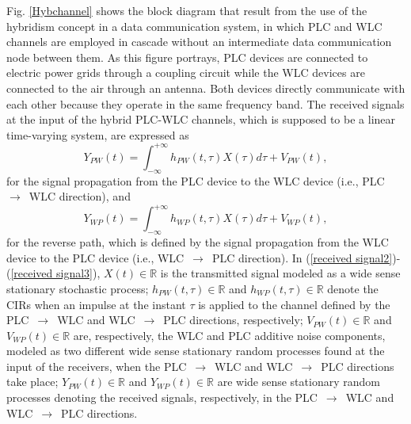 \documentclass[journal]{IEEEtran}
\begin{document}
Fig. \ref{Hybchannel} shows the block diagram that result from the use of the hybridism concept in a data communication system, in which \ac{PLC} and \ac{WLC} channels are employed in cascade without an intermediate data communication node between them. As this figure portrays, \ac{PLC} devices are connected to electric power grids through a coupling circuit while the \ac{WLC} devices are connected to the air through an antenna. Both devices directly communicate with each other because they operate in the same frequency band. The received signals at the input of the hybrid \ac{PLC}-\ac{WLC} channels, which is supposed to be a linear time-varying system, are expressed as
\begin{equation} \label{received signal2}
Y_{PW}(t) = \int_{-\infty}^{+\infty} h_{PW}(t,\tau) X(\tau) d\tau + V_{PW}(t),
\end{equation}
for the signal propagation from the \ac{PLC} device to the \ac{WLC} device (i.e., \ac{PLC}~$\rightarrow$~\ac{WLC} direction), and
\begin{equation} \label{received signal3}
Y_{WP}(t) = \int_{-\infty}^{+\infty} h_{WP}(t,\tau) X(\tau) d\tau + V_{WP}(t),
\end{equation}
for the reverse path, which is defined by the signal propagation from the \ac{WLC} device to the \ac{PLC} device (i.e., \ac{WLC}~$\rightarrow$~\ac{PLC} direction). In (\ref{received signal2})-(\ref{received signal3}),  $X(t)\in \mathbb{R}$ is the transmitted signal modeled as a wide sense stationary stochastic process; $h_{PW}(t,\tau)\in \mathbb{R}$ and $h_{WP}(t,\tau)\in \mathbb{R}$ denote the \acp{CIR} when an impulse at the instant $\tau$ is applied to the channel defined by the \ac{PLC}~$\rightarrow$~\ac{WLC} and \ac{WLC}~$\rightarrow$~\ac{PLC} directions, respectively; $V_{PW}(t)\in \mathbb{R}$ and $V_{WP}(t)\in \mathbb{R}$ are, respectively, the \ac{WLC} and \ac{PLC} additive noise components, modeled as two different wide sense stationary random processes found at the input of the receivers, when the \ac{PLC}~$\rightarrow$~\ac{WLC} and \ac{WLC}~$\rightarrow$~\ac{PLC} directions take place; $Y_{PW}(t)\in \mathbb{R}$ and ${Y}_{WP}(t)\in \mathbb{R}$ are wide sense stationary random processes denoting the received signals, respectively, in the \ac{PLC}~$\rightarrow$~\ac{WLC} and \ac{WLC}~$\rightarrow$~\ac{PLC} directions.
\end{document}
